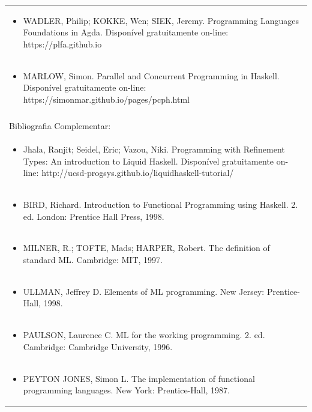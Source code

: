 \documentclass[11pt]{article}
\begin{document}
\begin{center}
\begin{longtable}{|p{4cm}|p{4cm}|p{4cm}|p{4cm}|}
\multicolumn{4}{|p{\dimexpr 16cm + 6\tabcolsep\relax}|}{\begin{itemize}\item WADLER, Philip; KOKKE, Wen; SIEK, Jeremy. Programming Languages Foundations in Agda. Disponível gratuitamente on-line: https://plfa.github.io\end{itemize}}\\
\multicolumn{4}{|p{\dimexpr 16cm + 6\tabcolsep\relax}|}{\begin{itemize}\item MARLOW, Simon. Parallel and Concurrent Programming in Haskell. Disponível gratuitamente on-line: https://simonmar.github.io/pages/pcph.html\end{itemize}}\\
\multicolumn{4}{|p{16cm}|}{}\\
\hline
\multicolumn{4}{|p{16cm}|}{Bibliografia Complementar:}\\*
\multicolumn{4}{|p{\dimexpr 16cm + 6\tabcolsep\relax}|}{\begin{itemize}\item Jhala, Ranjit; Seidel, Eric; Vazou, Niki. Programming with Refinement Types: An introduction to Liquid Haskell. Disponível gratuitamente on-line: http://ucsd-progsys.github.io/liquidhaskell-tutorial/\end{itemize}}\\
\multicolumn{4}{|p{\dimexpr 16cm + 6\tabcolsep\relax}|}{\begin{itemize}\item BIRD, Richard. Introduction to Functional Programming using Haskell. 2. ed. London: Prentice Hall Press, 1998.\end{itemize}}\\
\multicolumn{4}{|p{\dimexpr 16cm + 6\tabcolsep\relax}|}{\begin{itemize}\item MILNER, R.; TOFTE, Mads; HARPER, Robert. The definition of standard ML. Cambridge: MIT, 1997.\end{itemize}}\\
\multicolumn{4}{|p{\dimexpr 16cm + 6\tabcolsep\relax}|}{\begin{itemize}\item ULLMAN, Jeffrey D. Elements of ML programming. New Jersey: Prentice-Hall, 1998.\end{itemize}}\\
\multicolumn{4}{|p{\dimexpr 16cm + 6\tabcolsep\relax}|}{\begin{itemize}\item PAULSON, Laurence C. ML for the working programming. 2. ed. Cambridge: Cambridge University, 1996.\end{itemize}}\\
\multicolumn{4}{|p{\dimexpr 16cm + 6\tabcolsep\relax}|}{\begin{itemize}\item PEYTON JONES, Simon L. The implementation of functional programming languages. New York: Prentice-Hall, 1987.\end{itemize}}\\
\hline
\end{longtable}
\end{center}
\end{document}

